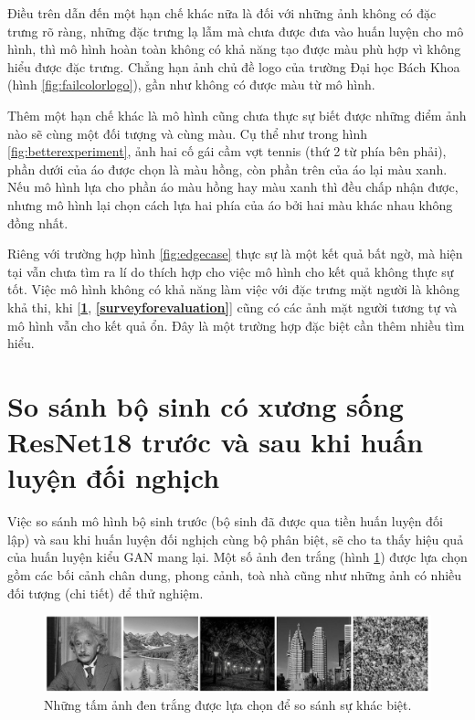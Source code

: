 \documentclass[a4paper, 12pt]{report}
\begin{document}
Điều trên dẫn đến một hạn chế khác nữa là đối với những ảnh không có đặc trưng rõ ràng, những đặc trưng lạ lẫm mà chưa được đưa vào huấn luyện cho mô hình, thì mô hình hoàn toàn không có khả năng tạo được màu phù hợp vì không hiểu được đặc trưng.
Chẳng hạn ảnh chủ đề logo của trường Đại học Bách Khoa (hình \ref{fig:failcolorlogo}), gần như không có được màu từ mô hình.\vspace{5pt}

Thêm một hạn chế khác là mô hình cũng chưa thực sự biết được những điểm ảnh nào sẽ cùng một đối tượng và cùng màu.
Cụ thể như trong hình \ref{fig:betterexperiment}, ảnh hai cố gái cầm vợt tennis (thứ 2 từ phía bên phải), phần dưới của áo được chọn là màu hồng, còn phần trên của áo lại màu xanh.
Nếu mô hình lựa cho phần áo màu hồng hay màu xanh thì đều chấp nhận được, nhưng mô hình lại chọn cách lựa hai phía của áo bởi hai màu khác nhau không đồng nhất.\vspace{5pt}

Riêng với trường hợp hình \ref{fig:edgecase} thực sự là một kết quả bất ngờ, mà hiện tại vẫn chưa tìm ra lí do thích hợp cho việc mô hình cho kết quả không thực sự tốt.
Việc mô hình không có khả năng làm việc với đặc trưng mặt người là không khả thi, khi [\textbf{\ref{compare}}, \textbf{\ref{surveyforevaluation}}] cũng có các ảnh mặt người tương tự và mô hình vẫn cho kết quả ổn.
Đây là một trường hợp đặc biệt cần thêm nhiều tìm hiểu.

\section{So sánh bộ sinh có xương sống ResNet18 trước và sau khi huấn luyện đối nghịch}\label{compare}

Việc so sánh mô hình bộ sinh trước (bộ sinh đã được qua tiền huấn luyện đối lập) và sau khi huấn luyện đối nghịch cùng bộ phân biệt, sẽ cho ta thấy hiệu quả của huấn luyện kiểu GAN mang lại.
Một số ảnh đen trắng (hình \ref{fig:sampletotest}) được lựa chọn gồm các bối cảnh chân dung, phong cảnh, toà nhà cũng như những ảnh có nhiều đối tượng (chi tiết) để thử nghiệm.

\begin{figure}[!h]
\captionsetup{width=0.8\textwidth}
\centering
\includegraphics[width=15cm]{images/4_2.PNG}
\caption{Những tấm ảnh đen trắng được lựa chọn để so sánh sự khác biệt.}
\label{fig:sampletotest}
\end{figure}
\end{document}
